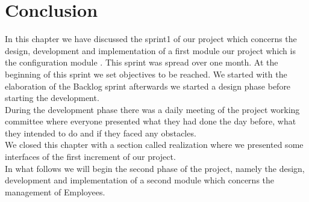 \section*{Conclusion}
In this chapter we have discussed the sprint1 of our project which concerns the design, development and implementation of a first module our project which is the configuration module . This sprint was spread over one month. At the beginning of this sprint we set objectives to be reached. We started with the elaboration of the Backlog sprint afterwards we started a design phase before starting the development. \\During the development phase there was a daily meeting of the project working committee where everyone presented what they had done the day before, what they intended to do and if they faced any obstacles.\\ We closed this chapter with a section called realization where we presented some interfaces of the first increment of our project.\\
In what follows we will begin the second phase of the project, namely the design, development and implementation of a second module which concerns the management of Employees.
